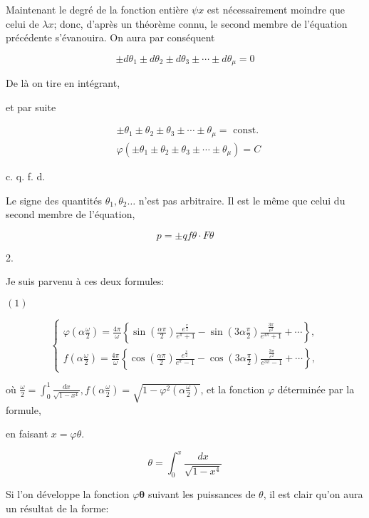 \documentclass{article}
\begin{document}
Maintenant le degré de la fonction entière \(\psi x\) est nécessairement moindre que celui de \(\lambda x\); donc, d'après un théorème connu, le second membre de l'équation précédente s'évanouira. On aura par conséquent

\[
\pm d \theta_{1} \pm d \theta_{2} \pm d \theta_{3} \pm \cdots \pm d \theta_{\mu}=0
\]

De là on tire en intégrant,

et par suite

\[
\begin{aligned}
& \pm \theta_{1} \pm \theta_{2} \pm \theta_{3} \pm \cdots \pm \theta_{\mu}=\text { const. } \\
& \varphi\left( \pm \theta_{1} \pm \theta_{2} \pm \theta_{3} \pm \cdots \pm \theta_{\mu}\right)=C
\end{aligned}
\]

c. q. f. d.

Le signe des quantités \(\theta_{1}, \theta_{2} \ldots\) n'est pas arbitraire. Il est le même que celui du second membre de l'équation,

\[
p= \pm q f \theta \cdot F \theta
\]

2.

Je suis parvenu à ces deux formules:

\((1)\)

\[
\left\{\begin{array}{l}
\varphi\left(\alpha \frac{\omega}{2}\right)=\frac{4 \pi}{\omega}\left\{\sin \left(\frac{\alpha \pi}{2}\right) \frac{e^{\frac{\pi}{2}}}{e^{\pi}+1}-\sin \left(3 \alpha \frac{\pi}{2}\right) \frac{\frac{3 \pi}{e^{2}}}{e^{3 \pi}+1}+\cdots\right\}, \\
f\left(\alpha \frac{\omega}{2}\right)=\frac{4 \pi}{\omega}\left\{\cos \left(\frac{\alpha \pi}{2}\right) \frac{e^{\frac{\pi}{2}}}{e^{\pi}-1}-\cos \left(3 \alpha \frac{\pi}{2}\right) \frac{\frac{3 \pi}{e^{2}}}{e^{3 \pi}-1}+\cdots\right\},
\end{array}\right.
\]

où \(\frac{\omega}{2}=\int_{0}^{1} \frac{d x}{\sqrt{1-x^{4}}}, f\left(\alpha \frac{\omega}{2}\right)=\sqrt{1-\varphi^{2}\left(\alpha \frac{\omega}{2}\right)}\), et la fonction \(\varphi\) déterminée par la formule,

en faisant \(x=\varphi \theta\).

\[
\theta=\int_{0}^{x} \frac{d x}{\sqrt{1-x^{4}}}
\]

Si l'on développe la fonction \(\varphi \boldsymbol{\theta}\) suivant les puissances de \(\theta\), il est clair qu'on aura un résultat de la forme:
\end{document}
